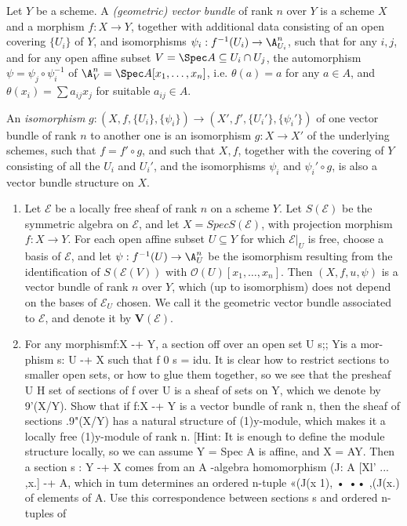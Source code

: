 \begin{exercise}%
	Let $Y $ be a scheme. A \textit{(geometric) vector bundle} of rank $n $ over $Y $ is a scheme $X $ and a morphism $f: X\to Y$, together with additional data consisting of an open covering $\{U_i\}   $ of $Y $, and isomorphisms $\psi_i: f^{-1}(U_i) \to \A^n_{U_i} $, such that for any $i,j $, and for any open affine subset $V = \Spec A \subseteq  U_i \cap U_j $, the automorphism $\psi = \psi_j\circ \psi_i ^{-1} $ of $\A^n_V = \Spec A[x_{1}, \ldots ,x_n] $, i.e. $\theta(a) = a $ for any $a \in A $, and $\theta (x_i) = \sum a_{ij}x_j $ for suitable $a_{ij} \in A $.

	An \textit{isomorphism} $g: (X,f,\{U_i\} ,\{\psi_i\} ) \to (X',f',\{U_i'\} ,\{\psi_i'\} )     $ of one vector bundle of rank $n $ to another one is an isomorphism $g: X\to X' $ of the underlying schemes, such that $f=  f' \circ g $, and such that $X,f $, together with the covering of $Y $ consisting of all the $U_i $ and $U_i' $, and the isomorphisms $\psi_i $ and $\psi_i'\circ g $, is also a vector bundle structure on $X $.
	\begin{enumerate}
		\item Let $\mathcal{E} $ be a locally free sheaf of rank $n $ on a scheme $Y $. Let $S(\mathcal{E})$ be the symmetric algebra on $\mathcal{E}$, and let $X = Spec S(\mathcal{E})$, with projection morphism $f:X \to Y$. For each open affine subset $U \subseteq Y$ for which $\mathcal{E}|_U $ is free, choose a basis of $\mathcal{E}$, and let $\psi: f^{-1}(U) \to \A^n_U $ be the isomorphism resulting from the identification of $S(\mathcal{E}(V))$ with $\mathcal{O}(U)[x_{1}, \ldots , x_n]$. Then $(X,f,{u},{\psi})$ is a vector bundle of rank $n$ over $Y$, which (up to isomorphism) does not depend on the bases of $\mathcal{E}_U$ chosen. We call it the geometric vector bundle associated to $\mathcal{E}$, and denote it by $\bm{V}(\mathcal{E})$.
		\item For any morphismf:X -+ Y, a section off over an open set U s;; Yis a mor- phism s: U -+ X such that f 0 s = idu. It is clear how to restrict sections to smaller open sets, or how to glue them together, so we see that the presheaf U H {set of sections of f over U} is a sheaf of sets on Y, which we denote by 9'(X/Y). Show that if f:X -+ Y is a vector bundle of rank n, then the sheaf of sections .9"(X/Y) has a natural structure of (1)y-module, which makes it a locally free (1)y-module of rank n. [Hint: It is enough to define the module structure locally, so we can assume Y = Spec A is affine, and X = AY. Then a section s : Y -+ X comes from an A -algebra homomorphism (J: A [Xl' ... ,x.] -+ A, which in tum determines an ordered n-tuple «(J(x 1), • •• ,(J(x.) of elements of A. Use this correspondence between sections s and ordered n-tuples of 

\end{enumerate}
\end{exercise}
